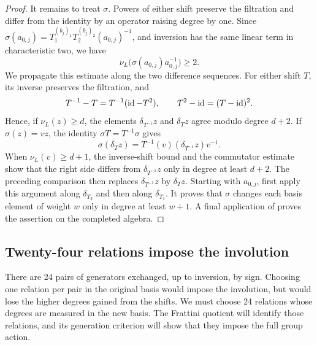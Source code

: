 \begin{proof}
It remains to treat \(\sigma\).  Powers of either shift preserve the
filtration and differ from the identity by an operator raising degree
by one.  Since
\(\sigma(a_{0,j})=T_1^{(b_j)_1}T_2^{(b_j)_2}(a_{0,j})^{-1}\),
and inversion has the same linear term in characteristic two, we have
\[
 \nu_L\bigl(\sigma(a_{0,j})a_{0,j}^{-1}\bigr)\ge2.
\]
We propagate this estimate along the two difference sequences.
For either shift \(T\), its inverse preserves the filtration, and
\[
 T^{-1}-T=T^{-1}(\operatorname{id}-T^2),
 \qquad T^2-\operatorname{id}=(T-\operatorname{id})^2.
\]
Hence, if \(\nu_L(z)\ge d\), the elements
\(\delta_{T^{-1}}z\) and \(\delta_Tz\) agree modulo degree \(d+2\).
If \(\sigma(z)=vz\), the identity
\(\sigma T=T^{-1}\sigma\) gives
\begin{equation}\label{eq:inverting-difference}
 \sigma(\delta_Tz)
   =T^{-1}(v)(\delta_{T^{-1}}z)v^{-1}.
\end{equation}
When \(\nu_L(v)\ge d+1\), the inverse-shift bound and the
commutator estimate show that the right side differs from
\(\delta_{T^{-1}}z\) only in degree at least \(d+2\).
The preceding comparison then replaces
\(\delta_{T^{-1}}z\) by \(\delta_Tz\).
Starting with \(a_{0,j}\), first apply this argument along
\(\delta_{T_2}\) and then along \(\delta_{T_1}\).
It proves that \(\sigma\) changes each basis element of weight \(w\)
only in degree at least \(w+1\).  A final application of
 proves the assertion on the completed algebra.
\end{proof}

\subsection{Twenty-four relations impose the involution}

There are 24 pairs of generators exchanged, up to inversion, by sign.
Choosing one relation per pair in the original basis would impose the
involution, but would lose the higher degrees gained from the shifts.
We must choose 24 relations whose degrees are measured in the new
basis. The Frattini quotient will identify those relations, and its
generation criterion will show that they impose the full group action.

